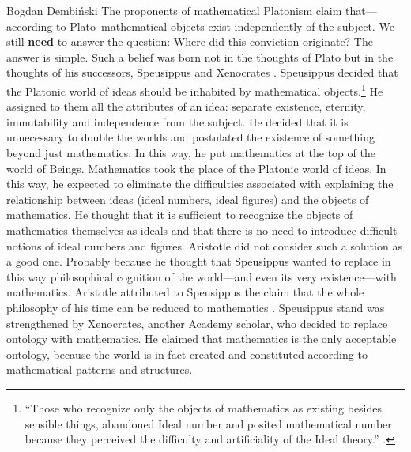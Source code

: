 \begin{artengenv}{Bogdan Dembiński}
The proponents of mathematical Platonism claim that---according to Plato–mathematical %
objects exist independently of the subject. We still \textbf{need} to answer the question: Where did this conviction  %
originate?%
The answer is simple. Such a belief was born not in the thoughts of Plato but in the thoughts of his successors,
Speusippus and Xenocrates
\parencite[see][]{dembinski_pozny_2010,dillon_heirs_2003}.
Speusippus decided that the Platonic world of ideas should be inhabited by mathematical
objects.\footnote{``Those who recognize
only the objects of mathematics as existing besides sensible things, abandoned Ideal number and posited mathematical
number because they perceived the difficulty and artificiality of the Ideal theory.''
\parencite[Methaphysics, 1086a]{aristotle_aristotles_1924}.
} He assigned to
them all the attributes of an idea: separate existence, eternity, immutability and independence from the subject. He
decided that it is unnecessary to double the worlds and postulated the existence of something beyond just mathematics.
In this way, he put mathematics at the top of the %
world of Beings. Mathematics took the place of the Platonic world of ideas. In this way, he expected to eliminate the
difficulties associated with explaining the relationship between ideas (ideal numbers, ideal figures) and the objects
of mathematics. He thought that it is sufficient to recognize the objects of mathematics themselves as ideals and that
there is no need to introduce difficult notions of ideal numbers and figures. Aristotle did not consider such a
solution as a good one. Probably because he thought that Speusippus wanted to replace in this way philosophical
cognition of the world---and even its very existence---with mathematics. Aristotle attributed to Speusippus the
claim that the whole philosophy of his time can be reduced to mathematics
\parencite[Methaphysics, 992a30]{aristotle_aristotles_1924}.
Speusippus stand was strengthened by Xenocrates, another Academy scholar, who decided to replace
ontology with mathematics. He claimed that mathematics is the only acceptable ontology, because the world is in fact
created and constituted according to mathematical patterns and structures.


\end{artengenv}
